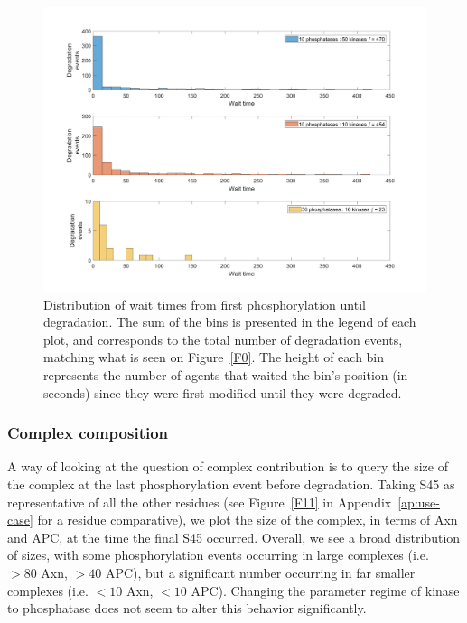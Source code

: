 \begin{figure}[h]
  \centering
  \includegraphics[width=\columnwidth]{wnt/F2_wait_times.png}
  \caption{Distribution of wait times from first phosphorylation until
    degradation. The sum of the bins is presented in the legend of
    each plot, and corresponds to the total number of degradation
    events, matching what is seen on Figure~\ref{F0}. The height of
    each bin represents the number of agents that waited the bin's
    position (in seconds) since they were first modified until they
    were degraded.}
  \label{F2}
\end{figure}


\subsubsection*{Complex composition}

A way of looking at the question of complex contribution is to query
the size of the complex at the last phosphorylation event before
degradation. Taking S45 as representative of all the other residues
(see Figure~\ref{F11} in Appendix~\ref{ap:use-case} for a residue comparative),
we plot the size of the complex, in terms of Axn and APC, at the time
the final S45 occurred. Overall, we see a broad distribution of sizes,
with some phosphorylation events occurring in large complexes
(i.e. $>80$ Axn, $>40$ APC), but a significant number occurring in far
smaller complexes (i.e. $<10$ Axn, $<10$ APC). Changing the parameter
regime of kinase to phosphatase does not seem to alter this behavior
significantly.

